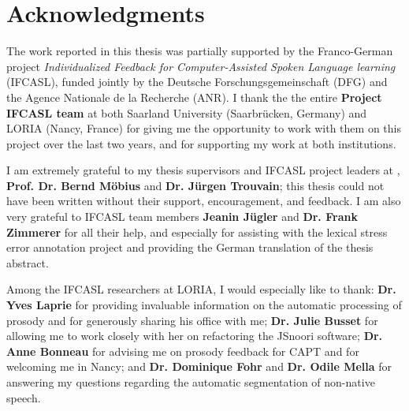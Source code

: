 %
\chapter*{Acknowledgments}
\label{sec:thanks}
\vspace*{-10mm}




The work reported in this thesis was partially supported by the Franco-German project \textit{Individualized Feedback for Computer-Assisted Spoken Language learning} (IFCASL), funded jointly by the Deutsche Forschungsgemeinschaft (DFG) and the Agence Nationale de la Recherche (ANR). I thank the the entire \textbf{Project IFCASL team} at both Saarland University (Saarbrücken, Germany) and LORIA (Nancy, France) for giving me the opportunity to work with them on this project over the last two years, and for supporting my work at both institutions.

I am extremely grateful to my thesis supervisors and IFCASL project leaders at {\thesisUniversity}, \textbf{Prof. Dr. Bernd Möbius} and \textbf{Dr. Jürgen Trouvain}; this thesis could not have been written without their support, encouragement, and feedback. 
I am also very grateful to IFCASL team members \textbf{Jeanin Jügler} and \textbf{Dr. Frank Zimmerer} for all their help, and especially for assisting with the lexical stress error annotation project and providing the German translation of the thesis abstract. 

Among the IFCASL researchers at LORIA, I would especially like to thank:
\textbf{Dr. Yves Laprie} for providing invaluable information on the automatic processing of prosody and for generously sharing his office with me;
\textbf{Dr. Julie Busset} for allowing me to work closely with her on refactoring the JSnoori software; %
\textbf{Dr. Anne Bonneau} for advising me on prosody feedback for CAPT and for welcoming me in Nancy;
and 
\textbf{Dr. Dominique Fohr} and \textbf{Dr. Odile Mella} for answering my questions regarding the automatic segmentation of non-native speech. 


